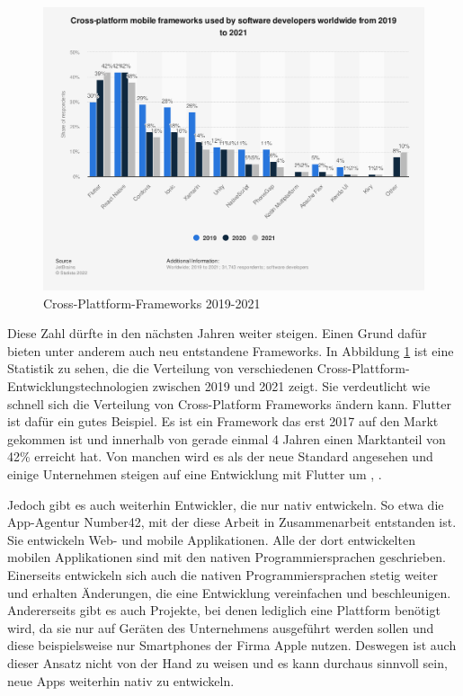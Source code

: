 \begin{figure}[ht]
  \centering
  \includegraphics[width=15cm,keepaspectratio]{images/cross-platform-mobile-frameworks.png} 
  \caption[Statistik Cross-Plattform-Frameworks]{Cross-Plattform-Frameworks 2019-2021 \cite{statist_CP_Framework}}
  \label{fig:statista_cross_plattform}
\end{figure}

Diese Zahl dürfte in den nächsten Jahren weiter steigen. Einen Grund dafür bieten unter anderem auch neu entstandene Frameworks. In Abbildung \ref{fig:statista_cross_plattform} ist eine Statistik zu sehen, die die Verteilung von verschiedenen Cross-Plattform-Entwicklungstechnologien zwischen 2019 und 2021 zeigt. Sie verdeutlicht wie schnell sich die Verteilung von Cross-Platform Frameworks ändern kann. Flutter ist dafür ein gutes Beispiel. Es ist ein Framework das erst 2017 auf den Markt gekommen ist und innerhalb von gerade einmal 4 Jahren einen Marktanteil von 42\% erreicht hat. Von manchen wird es als der neue Standard angesehen und einige Unternehmen steigen auf eine Entwicklung mit Flutter um \cite{flutter_move_to}, \cite{flutter_move_to_dart}. 

Jedoch gibt es auch weiterhin Entwickler, die nur nativ entwickeln. So etwa die App-Agentur Number42, mit der diese Arbeit in Zusammenarbeit entstanden ist. Sie entwickeln Web- und mobile Applikationen. Alle der dort entwickelten mobilen Applikationen sind mit den nativen Programmiersprachen geschrieben. Einerseits entwickeln sich auch die nativen Programmiersprachen stetig weiter und erhalten Änderungen, die eine Entwicklung vereinfachen und beschleunigen. Andererseits gibt es auch Projekte, bei denen lediglich eine Plattform benötigt wird, da sie nur auf Geräten des Unternehmens ausgeführt werden sollen und diese beispielsweise nur Smartphones der Firma Apple nutzen. Deswegen ist auch dieser Ansatz nicht von der Hand zu weisen und es kann durchaus sinnvoll sein, neue Apps weiterhin nativ zu entwickeln.

